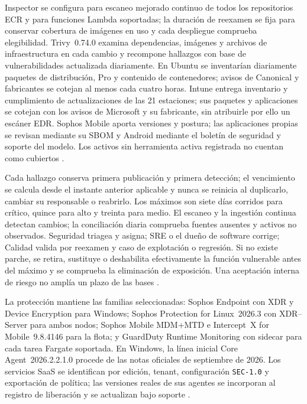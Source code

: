 Inspector se configura para escaneo mejorado continuo de todos los repositorios ECR y para funciones Lambda soportadas; la duración de reexamen se fija para conservar cobertura de imágenes en uso y cada despliegue comprueba elegibilidad. Trivy~0.74.0 examina dependencias, imágenes y archivos de infraestructura en cada cambio y recompone hallazgos con base de vulnerabilidades actualizada diariamente. En Ubuntu se inventarían diariamente paquetes de distribución, Pro y contenido de contenedores; avisos de Canonical y fabricantes se cotejan al menos cada cuatro horas. Intune entrega inventario y cumplimiento de actualizaciones de las 21 estaciones; sus paquetes y aplicaciones se cotejan con los avisos de Microsoft y su fabricante, sin atribuirle por ello un escáner EDR. Sophos Mobile aporta versiones y postura; las aplicaciones propias se revisan mediante su SBOM y Android mediante el boletín de seguridad y soporte del modelo. Los activos sin herramienta activa registrada no cuentan como cubiertos \parencites{sec-inspector,sec-trivy,p3-intune-licencia}.

Cada hallazgo conserva primera publicación y primera detección; el vencimiento se calcula desde el instante anterior aplicable y nunca se reinicia al duplicarlo, cambiar su responsable o reabrirlo. Los máximos son siete días corridos para crítico, quince para alto y treinta para medio. El escaneo y la ingestión continua detectan cambios; la conciliación diaria comprueba fuentes ausentes y activos no observados. Seguridad triagea y asigna; SRE o el dueño de software corrige; Calidad valida por reexamen y caso de explotación o regresión. Si no existe parche, se retira, sustituye o deshabilita efectivamente la función vulnerable antes del máximo y se comprueba la eliminación de exposición. Una aceptación interna de riesgo no amplía un plazo de las bases \parencite[RT-11.04, p.~23]{pucv-transversal}.

La protección mantiene las familias seleccionadas: Sophos Endpoint con XDR y Device Encryption para Windows; Sophos Protection for Linux~2026.3 con XDR--Server para ambos nodos; Sophos Mobile MDM+MTD e Intercept~X for Mobile~9.8.4146 para la flota; y GuardDuty Runtime Monitoring con sidecar para cada tarea Fargate soportada. En Windows, la línea inicial Core Agent~2026.2.2.1.0 procede de las notas oficiales de septiembre de 2026. Los servicios SaaS se identifican por edición, tenant, configuración \texttt{SEC-1.0} y exportación de política; las versiones reales de sus agentes se incorporan al registro de liberación y se actualizan bajo soporte \parencites{sec-sophos-windows,p3-sophos-linux,sec-sophos-android,p3-guardduty}.

